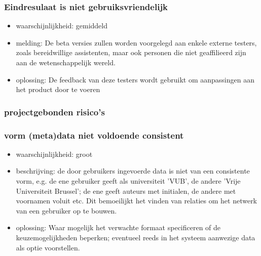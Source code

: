\subsubsection*{Eindresulaat is niet gebruiksvriendelijk}
\begin{itemize}
\item waarschijnlijkheid: gemiddeld
\item melding: De beta versies zullen worden voorgelegd aan enkele externe testers, zoals bereidwillige assistenten, maar ook personen die niet geaffilieerd zijn aan de wetenschappelijk wereld.
\item oplossing: De feedback van deze testers wordt gebruikt om aanpassingen aan het product door te voeren
\end{itemize}

\subsubsection{projectgebonden risico's}

\subsubsection*{vorm (meta)data niet voldoende consistent}
\begin{itemize}
\item waarschijnlijkheid: groot
\item beschrijving: de door gebruikers ingevoerde data is niet van een consistente vorm, e.g. de ene gebruiker geeft als universiteit 'VUB', de andere 'Vrije Universiteit Brussel'; de ene geeft auteurs met initialen, de andere met voornamen voluit etc. Dit bemoeilijkt het vinden van relaties om het netwerk van een gebruiker op te bouwen.
\item oplossing: Waar mogelijk het verwachte formaat specificeren of de keuzemogelijkheden beperken; eventueel reeds in het systeem aanwezige data als optie voorstellen.
\end{itemize}

